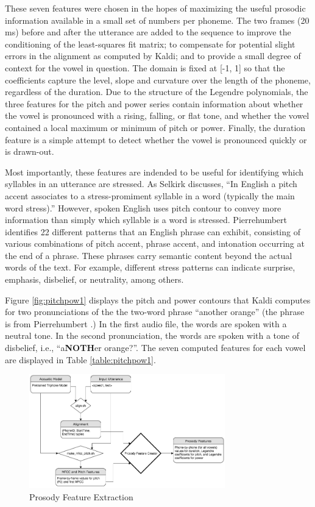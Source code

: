 \documentclass{article}
\begin{document}
These seven features were chosen in the hopes of maximizing the useful prosodic information available in a small set of numbers per phoneme.
The two frames (20 ms) before and after the utterance are added to the sequence to improve the conditioning of the least-squares fit matrix; to compensate for potential slight errors in the alignment as computed by Kaldi; and to provide a small degree of context for the vowel in question.
The domain is fixed at [-1, 1] so that the coefficients capture the level, slope and curvature over the length of the phoneme, regardless of the duration.
Due to the structure of the Legendre polynomials, the three features for the pitch and power series contain information about whether the vowel is pronounced with a rising, falling, or flat tone, and whether the vowel contained a local maximum or minimum of pitch or power.
Finally, the duration feature is a simple attempt to detect whether the vowel is pronounced quickly or is drawn-out.

Most importantly, these features are indended to be useful for identifying which syllables in an utterance are stressed. As Selkirk \cite{selkirk1995sentence} discusses, ``In English a pitch accent associates to a stress-promiment syllable in a word (typically the main word stress).''
However, spoken English uses pitch contour to convey more information than simply which syllable is a word is stressed. Pierrehumbert \cite{pierrehumbert1980phonology} identifies 22 different patterns that an English phrase can exhibit, consisting of various combinations of pitch accent, phrase accent, and intonation occurring at the end of a phrase.
These phrases carry semantic content beyond the actual words of the text. For example, different stress patterns can indicate surprise, emphasis, disbelief, or neutrality, among others.

Figure \ref{fig:pitchpow1} displays the pitch and power contours that Kaldi computes for two pronunciations of the the two-word phrase ``another orange'' (the phrase is from Pierrehumbert \cite{pierrehumbert1980phonology}.) In the first audio file, the words are spoken with a neutral tone. In the second pronunciation, the words are spoken with a tone of disbelief, i.e., ``a\textbf{NOTH}er orange?''. The seven computed features for each vowel are displayed in Table \ref{table:pitchpow1}.

\begin{figure}[htb]

\begin{minipage}[b]{1.0\linewidth}
  \centering
  \centerline{\includegraphics[width=8.5cm]{Prosody_Extraction.png}}
\end{minipage}
\caption{Prosody Feature Extraction}
\label{fig:prosodyextraction}
\end{figure}
\end{document}
